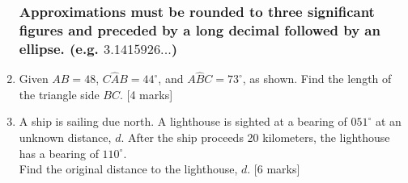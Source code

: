 \documentclass[12pt, twoside]{article}
\begin{document}
\begin{enumerate}
\newpage
\subsubsection*{Approximations must be rounded to three significant figures and preceded by a long decimal followed by an ellipse. (e.g. $3.1415926 ...$)}
  \item Given $AB=48$, $C\hat{A}B=44^\circ$, and $A\hat{B}C=73^\circ$, as shown. Find the length of the triangle side $BC$. \hfill [4 marks]
  \begin{flushright}
    \end{flushright}  \vspace{3cm}

    \item A ship is sailing due north. A lighthouse is sighted at a bearing of $051^\circ$ at an unknown distance, $d$. After the ship proceeds 20 kilometers, the lighthouse has a bearing of $110^\circ$. \\[0.5cm]
    Find the original distance to the lighthouse, $d$. \hfill [6 marks]

\end{enumerate}
\end{document}
